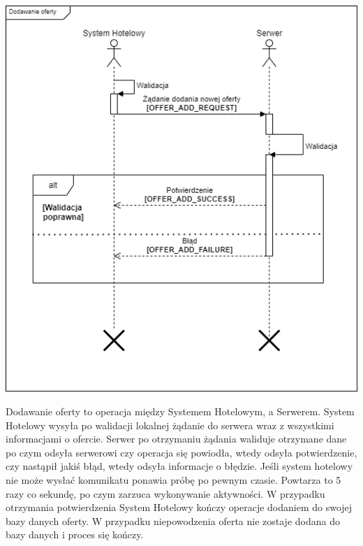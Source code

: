 \documentclass{article}
\begin{document}
\begin{center}
    \includegraphics[width=\linewidth]{Sekwencje/Offer_Add.png}
\end{center}
Dodawanie oferty to operacja między Systemem Hotelowym, a Serwerem.
System Hotelowy wysyła po walidacji lokalnej żądanie do serwera wraz z wszystkimi informacjami o ofercie.
Serwer po otrzymaniu żądania waliduje otrzymane dane po czym odsyła serwerowi czy operacja się powiodła, wtedy odsyła potwierdzenie, czy nastąpił jakiś błąd, wtedy odsyła informacje o błędzie.
Jeśli system hotelowy nie może wysłać komunikatu ponawia próbę po pewnym czasie. Powtarza to 5 razy co sekundę, po czym zarzuca wykonywanie aktywności.
W przypadku otrzymania potwierdzenia System Hotelowy kończy operacje dodaniem do swojej bazy danych oferty.
W przypadku niepowodzenia oferta nie zostaje dodana do bazy danych i proces się kończy.
\end{document}
